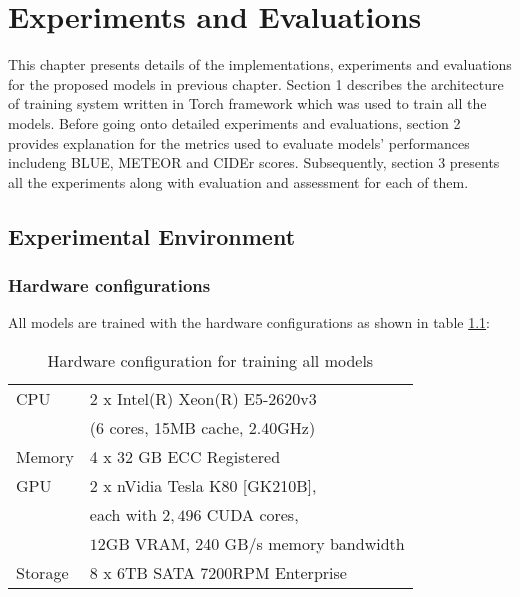 \chapter{Experiments and Evaluations}
\label{ch:experiments}

This chapter presents details of the implementations, experiments and evaluations for the proposed models in previous chapter. Section 1 describes the architecture of training system written in Torch framework which was used to train all the models. Before going onto detailed experiments and evaluations, section 2 provides explanation for the metrics used to evaluate models' performances includeng BLUE, METEOR and CIDEr scores. Subsequently, section 3 presents all the experiments along with evaluation and assessment for each of them.


\section{Experimental Environment}
\label{sec:chap4_environment}

\subsection{Hardware configurations}
\label{sec:hardware}
All models are trained with the hardware configurations as shown in table \ref{tab:hardware_configuration}:

\begin{table}
	\centering
	\caption{Hardware configuration for training all models}	
	\label{tab:hardware_configuration}
	\begin{tabularx}{0.65\textwidth}{ll}
		\toprule
		CPU & 2 x Intel(R) Xeon(R) E5-2620v3 \\
			& (6 cores, 15MB cache, 2.40GHz) \\
		\midrule
		Memory & 4 x 32 GB ECC Registered \\
		\midrule 
		GPU & 2 x nVidia Tesla K80 [GK210B], \\
			& each with $2,496$ CUDA cores, \\
			& $12$GB VRAM, 240 GB/s memory bandwidth \\
		\midrule
		Storage & 8 x 6TB SATA 7200RPM Enterprise \\
		\bottomrule
	\end{tabularx}
\end{table}



